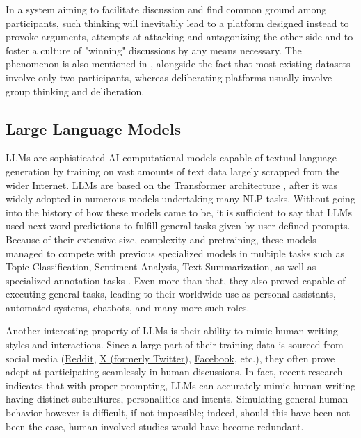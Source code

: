 In a system aiming to facilitate discussion and find common ground among participants, such thinking will inevitably lead to a platform designed instead to provoke arguments, attempts at attacking and antagonizing the other side and to foster a culture of "winning" discussions by any means necessary. The phenomenon is also mentioned in \cite{karadzhov2023delidata}, alongside the fact that most existing datasets involve only two participants, whereas deliberating platforms usually involve group thinking and deliberation. 

\subsection{Large Language Models}
\label{sec:background:llm}

\acp{LLM} are sophisticated \ac{AI} computational models capable of textual language generation by training on vast amounts of text data largely scrapped from the wider Internet. LLMs are based on the Transformer architecture \cite{vaswani2023attentionneed}, after it was widely adopted in numerous models undertaking many \ac{NLP} tasks. Without going into the history of how these models came to be, it is sufficient to say that LLMs used next-word-predictions to fulfill general tasks given by user-defined prompts. Because of their extensive size, complexity and pretraining, these models managed to compete with  previous specialized models in multiple tasks such as Topic Classification, Sentiment Analysis, Text Summarization, \cite{ts2024} as well as specialized annotation tasks \cite{tan2024largelanguagemodelsdata}.  Even more than that, they also proved capable of executing general tasks, leading to their worldwide use as personal assistants, automated systems, chatbots, and many more such roles. 

Another interesting property of LLMs is their ability to mimic human writing styles and interactions. Since a large part of their training data is sourced from social media (\href{https://www.reddit.com}{Reddit}, \href{https://www.twitter.com}{X (formerly Twitter)}, \href{https://www.facebook.com}{Facebook}, etc.), they often prove adept at participating seamlessly in human discussions. In fact, recent research \cite{Vezhnevets2023GenerativeAM, aher2023usinglargelanguagemodels} indicates that with proper prompting, LLMs can accurately mimic human writing having distinct subcultures, personalities and intents. Simulating general human behavior however is difficult, if not impossible; indeed, should this have been not been the case, human-involved studies would have become redundant.

